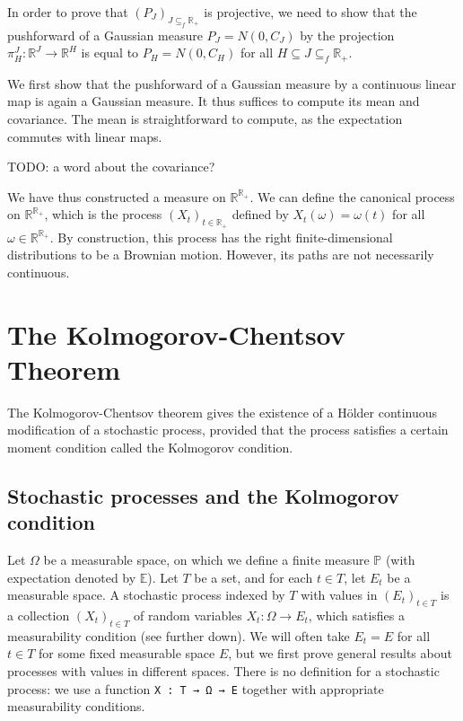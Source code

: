 \documentclass[lean]{Draft}
\begin{document}
In order to prove that $(P_J)_{J \subseteq_f \mathbb{R}_+}$ is projective, we need to show that the pushforward of a Gaussian measure $P_J = N(0, C_J)$ by the projection $\pi_H^J : \mathbb{R}^J \to \mathbb{R}^H$ is equal to $P_H = N(0, C_H)$ for all $H \subseteq J \subseteq_f \mathbb{R}_+$.

We first show that the pushforward of a Gaussian measure by a continuous linear map is again a Gaussian measure.
It thus suffices to compute its mean and covariance. The mean is straightforward to compute, as the expectation commutes with linear maps.

TODO: a word about the covariance?

We have thus constructed a measure on $\mathbb{R}^{\mathbb{R}_+}$.
We can define the canonical process on $\mathbb{R}^{\mathbb{R}_+}$, which is the process $(X_t)_{t \in \mathbb{R}_+}$ defined by $X_t(\omega) = \omega(t)$ for all $\omega \in \mathbb{R}^{\mathbb{R}_+}$.
By construction, this process has the right finite-dimensional distributions to be a Brownian motion.
However, its paths are not necessarily continuous.

\section{The Kolmogorov-Chentsov Theorem}
\label{S:continuity}

The Kolmogorov-Chentsov theorem gives the existence of a Hölder continuous modification of a stochastic process, provided that the process satisfies a certain moment condition called the Kolmogorov condition.


\subsection{Stochastic processes and the Kolmogorov condition}

Let $\Omega$ be a measurable space, on which we define a finite measure $\mathbb{P}$ (with expectation denoted by $\mathbb{E}$).
Let $T$ be a set, and for each $t \in T$, let $E_t$ be a measurable space.
A stochastic process indexed by $T$ with values in $(E_t)_{t \in T}$ is a collection $(X_t)_{t \in T}$ of random variables $X_t : \Omega \to E_t$, which satisfies a measurability condition (see further down).
We will often take $E_t = E$ for all $t \in T$ for some fixed measurable space $E$, but we first prove general results about processes with values in different spaces.
There is no \Lean definition for a stochastic process: we use a function \lstinline|X : T → Ω → E| together with appropriate measurability conditions.
\end{document}
